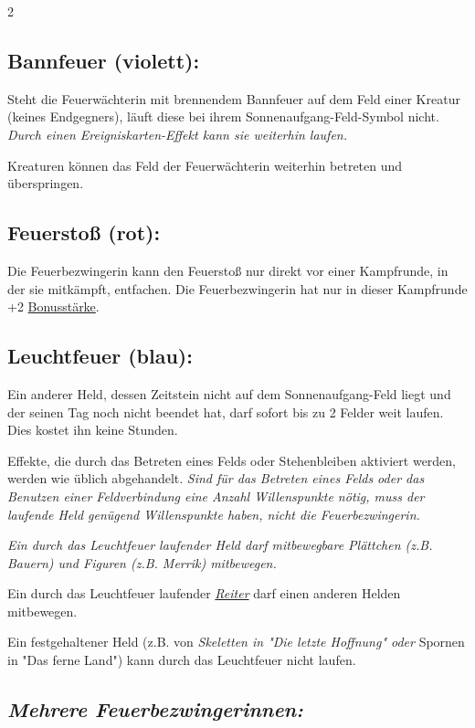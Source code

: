 \documentclass[10pt, a4paper, oneside]{book}
\newcommand{\fan}[1]{\textit{#1}}
\begin{document}
\begin{multicols*}{2}
\begin{nobgcolor}
\subsection{Bannfeuer (violett):}

Steht die Feuerwächterin mit brennendem Bannfeuer auf dem Feld einer Kreatur (keines Endgegners), läuft diese bei ihrem Sonnenaufgang-Feld-Symbol nicht. \fan{Durch einen Ereigniskarten-Effekt kann sie weiterhin laufen.}

Kreaturen können das Feld der Feuerwächterin weiterhin betreten und überspringen.


\subsection{Feuerstoß (rot):}

Die Feuerbezwingerin kann den Feuerstoß nur direkt vor einer Kampfrunde, in der sie mitkämpft, entfachen. Die Feuerbezwingerin hat nur in dieser Kampfrunde +2 \hyperref[bonusstaerke]{Bonusstärke}.


\subsection{Leuchtfeuer (blau):}

Ein anderer Held, dessen Zeitstein nicht auf dem Sonnenaufgang-Feld liegt und der seinen Tag noch nicht beendet hat, darf sofort {bis zu} 2 Felder weit laufen. Dies kostet ihn keine Stunden.

Effekte, die durch das Betreten eines Felds oder Stehenbleiben aktiviert werden, werden wie üblich abgehandelt. \fan{Sind für das Betreten eines Felds oder das Benutzen einer Feldverbindung eine Anzahl Willenspunkte nötig, muss der laufende Held genügend Willenspunkte haben, nicht die Feuerbezwingerin.}

\fan{Ein durch das Leuchtfeuer laufender Held darf mitbewegbare Plättchen (z.B. Bauern) und Figuren (z.B. Merrik) mitbewegen.}

Ein durch das Leuchtfeuer laufender \hyperref[reiter]{\fan{Reiter}} darf einen anderen Helden mitbewegen.
\supercite{127533}

Ein festgehaltener Held (z.B. von \fan{Skeletten in "Die letzte Hoffnung" oder} Spornen in "Das ferne Land") kann durch das Leuchtfeuer nicht laufen.
\supercite{dfl-begleitheft,127533} 


\subsection{\fan{Mehrere Feuerbezwingerinnen:}}


\end{nobgcolor}
\end{multicols*}
\end{document}
